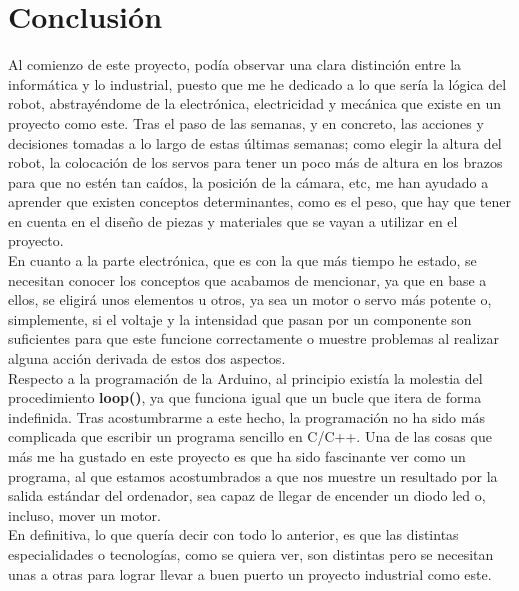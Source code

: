 \documentclass[11pt]{article}
\begin{document}
\section{Conclusión}
Al comienzo de este proyecto, podía observar una clara distinción entre la informática y lo industrial, puesto que me he dedicado a lo que sería la lógica del robot, abstrayéndome de la electrónica, electricidad y mecánica que existe en un proyecto como este. Tras el paso de las semanas, y en concreto, las acciones y decisiones tomadas a lo largo de estas últimas semanas; como elegir la altura del robot, la colocación de los servos para tener un poco más de altura en los brazos para que no estén tan caídos, la posición de la cámara, etc, me han ayudado a aprender que existen conceptos determinantes, como es el peso, que hay que tener en cuenta en el diseño de piezas y materiales que se vayan a utilizar en el proyecto.\\
En cuanto a la parte electrónica, que es con la que más tiempo he estado, se necesitan conocer los conceptos que acabamos de mencionar, ya que en base a ellos, se eligirá unos elementos u otros, ya sea un motor o servo más potente o, simplemente, si el voltaje y la intensidad que pasan por un componente son suficientes para que este funcione correctamente o muestre problemas al realizar alguna acción derivada de estos dos aspectos.\\
Respecto a la programación de la Arduino, al principio existía la molestia del procedimiento \textbf{loop()}, ya que funciona igual que un bucle que itera de forma indefinida. Tras acostumbrarme a este hecho, la programación no ha sido más complicada que escribir un programa sencillo en C/C++. Una de las cosas que más me ha gustado en este proyecto es que ha sido fascinante ver como un programa, al que estamos acostumbrados a que nos muestre un resultado por la salida estándar del ordenador, sea capaz de llegar de encender un diodo led o, incluso, mover un motor.\\
En definitiva, lo que quería decir con todo lo anterior, es que las distintas especialidades o tecnologías, como se quiera ver, son distintas pero se necesitan unas a otras para lograr llevar a buen puerto un proyecto industrial como este.
\end{document}
